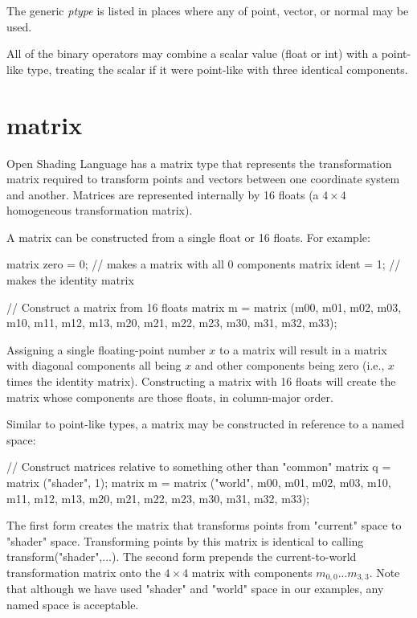 \documentclass[11pt,letterpaper]{book}
\def\langname{Open Shading Language\xspace}
\def\float{{\cf float}\xspace}
\def\inttype{{\cf int}\xspace}
\def\matrix{{\cf matrix}\xspace}
\def\normal{{\cf normal}\xspace}
\def\point{{\cf point}\xspace}
\def\vector{{\cf vector}\xspace}
\def\currentspace{{\cf "current"} space\xspace}
\def\shaderspace{{\cf "shader"} space\xspace}
\begin{document}
\smallskip

\noindent The generic \emph{ptype} is listed in places where any
of \point, \vector, or \normal may be used.

All of the binary operators may combine a scalar value (\float or
\inttype) with a point-like type, treating the scalar if it were
point-like with three identical components.


\section{{\cf matrix}}
\label{sec:types:matrix}
 

\langname has a \matrix type that represents the transformation matrix
required to transform points and vectors between one coordinate system
and another.  Matrices are represented internally by 16 floats (a $4
\times 4$ homogeneous transformation matrix).

A \matrix can be constructed from a single float or 16 floats.  For
example:

\begin{code}
    matrix zero = 0;   // makes a matrix with all 0 components
    matrix ident = 1;  // makes the identity matrix

    // Construct a matrix from 16 floats
    matrix m = matrix (m00, m01, m02, m03, m10, m11, m12, m13, 
                       m20, m21, m22, m23, m30, m31, m32, m33);
\end{code}

\noindent Assigning a single floating-point number $x$ to a matrix will result
in a matrix with diagonal components all being $x$ and other
components being zero (i.e., $x$ times the identity matrix).
Constructing a matrix with 16 floats will create the matrix whose
components are those floats, in column-major order.  

Similar to point-like types, a {\cf matrix} may be constructed in
reference to a named space:

\begin{code}
    // Construct matrices relative to something other than "common"
    matrix q = matrix ("shader", 1);
    matrix m = matrix ("world", m00, m01, m02, m03, m10, m11, m12, m13, 
                               m20, m21, m22, m23, m30, m31, m32, m33);
\end{code}

\noindent The first form creates the matrix that transforms points from
\currentspace to \shaderspace.  Transforming points by this matrix
is identical to calling {\cf transform("shader",...)}.
The second form prepends the current-to-world transformation matrix
onto the $4 \times 4$ matrix with components $m_{0,0} ... m_{3,3}$.
Note that although we have used {\cf "shader"} and {\cf "world"}
space in our examples, any named space is acceptable.
\end{document}

